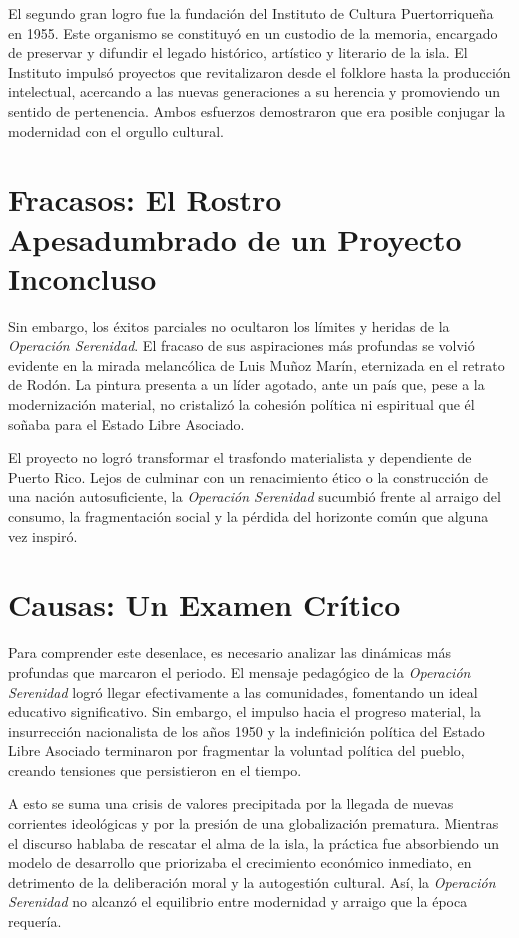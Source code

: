 \documentclass[
]{book}
\begin{document}
El segundo gran logro fue la fundación del Instituto de Cultura Puertorriqueña en 1955. Este organismo se constituyó en un custodio de la memoria, encargado de preservar y difundir el legado histórico, artístico y literario de la isla. El Instituto impulsó proyectos que revitalizaron desde el folklore hasta la producción intelectual, acercando a las nuevas generaciones a su herencia y promoviendo un sentido de pertenencia. Ambos esfuerzos demostraron que era posible conjugar la modernidad con el orgullo cultural.

\section{Fracasos: El Rostro Apesadumbrado de un Proyecto Inconcluso}\label{fracasos-el-rostro-apesadumbrado-de-un-proyecto-inconcluso}

Sin embargo, los éxitos parciales no ocultaron los límites y heridas de la \emph{Operación Serenidad}. El fracaso de sus aspiraciones más profundas se volvió evidente en la mirada melancólica de Luis Muñoz Marín, eternizada en el retrato de Rodón. La pintura presenta a un líder agotado, ante un país que, pese a la modernización material, no cristalizó la cohesión política ni espiritual que él soñaba para el Estado Libre Asociado.

El proyecto no logró transformar el trasfondo materialista y dependiente de Puerto Rico. Lejos de culminar con un renacimiento ético o la construcción de una nación autosuficiente, la \emph{Operación Serenidad} sucumbió frente al arraigo del consumo, la fragmentación social y la pérdida del horizonte común que alguna vez inspiró.

\section{Causas: Un Examen Crítico}\label{causas-un-examen-cruxedtico}

Para comprender este desenlace, es necesario analizar las dinámicas más profundas que marcaron el periodo. El mensaje pedagógico de la \emph{Operación Serenidad} logró llegar efectivamente a las comunidades, fomentando un ideal educativo significativo. Sin embargo, el impulso hacia el progreso material, la insurrección nacionalista de los años 1950 y la indefinición política del Estado Libre Asociado terminaron por fragmentar la voluntad política del pueblo, creando tensiones que persistieron en el tiempo.

A esto se suma una crisis de valores precipitada por la llegada de nuevas corrientes ideológicas y por la presión de una globalización prematura. Mientras el discurso hablaba de rescatar el alma de la isla, la práctica fue absorbiendo un modelo de desarrollo que priorizaba el crecimiento económico inmediato, en detrimento de la deliberación moral y la autogestión cultural. Así, la \emph{Operación Serenidad} no alcanzó el equilibrio entre modernidad y arraigo que la época requería.
\end{document}
